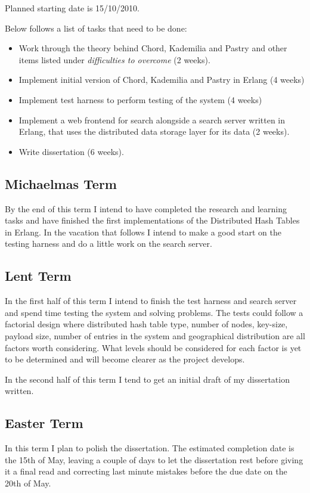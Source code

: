 Planned starting date is 15/10/2010.

Below follows a list of tasks that need to be done:

\begin{itemize}
  \item Work through the theory behind Chord, Kademilia and Pastry and other items listed under \emph{difficulties to overcome} (2 weeks).
  \item Implement initial version of Chord, Kademilia and Pastry in Erlang (4 weeks)
  \item Implement test harness to perform testing of the system (4 weeks)
  \item Implement a web frontend for search alongside a search server written in Erlang, that uses the distributed data storage layer for its data (2 weeks).
  \item Write dissertation (6 weeks).
\end{itemize}

\subsection*{Michaelmas Term}

By the end of this term I intend to have completed the research and learning tasks and have finished the first implementations of the Distributed Hash Tables in Erlang. In the vacation that follows I intend to make a good start on the testing harness and do a little work on the search server.


\subsection*{Lent Term}

In the first half of this term I intend to finish the test harness and search server and spend time testing the system and solving problems. The tests could follow a factorial design where distributed hash table type, number of nodes, key-size, payload size, number of entries in the system and geographical distribution are all factors worth considering. What levels should be considered for each factor is yet to be determined and will become clearer as the project develops.

In the second half of this term I tend to get an initial draft of my dissertation written.


\subsection*{Easter Term}

In this term I plan to polish the dissertation. The estimated completion date is the 15th of May, leaving a couple of days to let the dissertation rest before giving it a final read and correcting last minute mistakes before the due date on the 20th of May.


